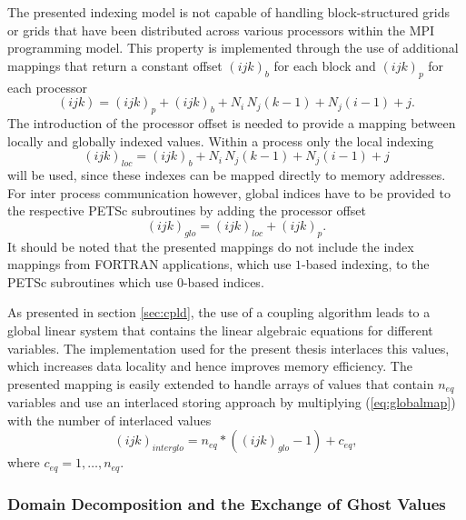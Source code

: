 The presented indexing model is not capable of handling block-structured grids or grids that have been distributed across various processors within the MPI programming model. This property is implemented through the use of additional mappings that return a constant offset \((ijk)_b\) for each block and \((ijk)_p\) for each processor
\begin{displaymath}
  (ijk) = (ijk)_p + (ijk)_b +  N_i \, N_j \left(k - 1\right) + N_j \left(i - 1\right) + j.
\end{displaymath}
The introduction of the processor offset is needed to provide a mapping between locally and globally indexed values. Within a process only the local indexing 
\begin{displaymath}
  (ijk)_{loc} = (ijk)_b +  N_i \, N_j \left(k - 1\right) + N_j \left(i - 1\right) + j
\end{displaymath}
will be used, since these indexes can be mapped directly to memory addresses. For inter process communication however, global indices have to be provided to the respective PETSc subroutines by adding the processor offset
\begin{equation}
  \label{eq:globalmap}
  (ijk)_{glo} = (ijk)_{loc} + (ijk)_p.
\end{equation}
It should be noted that the presented mappings do not include the index mappings from FORTRAN applications, which use \(1\)-based indexing, to the PETSc subroutines which use \(0\)-based indices.

As presented in section \ref{sec:cpld}, the use of a coupling algorithm leads to a global linear system that contains the linear algebraic equations for different variables. The implementation used for the present thesis interlaces this values, which increases data locality and hence improves memory efficiency. The presented mapping is easily extended to handle arrays of values that contain \(n_{eq}\) variables and use an interlaced storing approach by multiplying (\ref{eq:globalmap}) with the number of interlaced values
\begin{displaymath}
  (ijk)_{interglo} = n_{eq} * \left( (ijk)_{glo}  - 1 \right) + c_{eq},
\end{displaymath}
where \(c_{eq} = 1,\dots,n_{eq} \).

\subsubsection{Domain Decomposition and the Exchange of Ghost Values}

